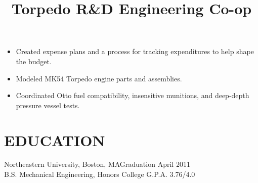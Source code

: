 \documentclass[line]{res}
\begin{document}
\begin{resume}
\title{Torpedo R\&D Engineering Co-op}
\begin {position}
\vspace {-10 pt}
\begin{itemize}
\item Created expense plans and a process for tracking expenditures to help shape the budget.
\item Modeled MK54 Torpedo engine parts and assemblies.
\item Coordinated Otto fuel compatibility, insensitive munitions, and deep-depth
    pressure vessel tests.
\end{itemize}
\end{position}

\section{EDUCATION}
Northeastern University, Boston, MA\hfill Graduation April 2011 \\
B.S. Mechanical Engineering, Honors College \hfill G.P.A. 3.76/4.0 \

\end{resume}
\end{document}
